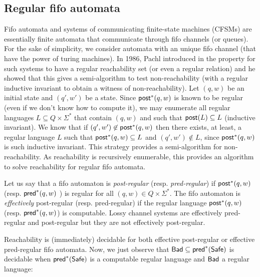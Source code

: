
%
%



\subsection{Regular fifo automata}

Fifo automata and systems of communicating finite-state machines (CFSMs) are essentially finite automata that communicate through fifo channels (or queues). For the sake of simplicity, we consider automata with an unique fifo channel (that have the power of turing machines). In 1986, Pachl introduced in \cite{} the property for such systems to have a regular reachability set (or even a regular relation) and he showed that this gives a semi-algorithm to test non-reachability (with a regular inductive invariant to obtain a witness of non-reachability). Let $(q,w)$ be an initial state and $(q',w')$ be a state. Since $\textsf{post}^*(q,w)$ is known to be regular (even if we don't know how to compute it), we may enumerate all regular languages $L \subseteq Q \times \Sigma^*$ that contain $(q,w)$ and such that $\textsf{post}(L) \subseteq L$ (inductive invariant). We know that if $(q',w') \not\in \textsf{post}^*(q,w)$ then there exists, at least, a regular language $L$ such that $\textsf{post}^*(q,w) \subseteq L$ and $(q',w') \not\in L$, since $\textsf{post}^*(q,w)$ is such inductive invariant. This strategy provides a semi-algorithm for non-reachability.
As reachability is recursively enumerable, this provides an algorithm to solve reachability for regular fifo automata.

Let us say that a fifo automaton is \emph{post-regular} (resp. \emph{pred-regular}) if $\textsf{post}^*(q,w)$ (resp. $\textsf{pred}^*(q,w)$ ) is regular for all $(q,w) \in Q \times \Sigma^*$. The  fifo automaton is \emph{effectively} post-regular (resp. pred-regular) if the regular language $\textsf{post}^*(q,w)$ (resp. $\textsf{pred}^*(q,w)$) is computable. Lossy channel systems are effectively pred-regular and post-regular but they are not effectively post-regular.

Reachability is (immediately) decidable for both effective post-regular or effective pred-regular fifo automata.
%
%
%
Now, we just observe that $\textsf{Bad} \subseteq \textsf{pred}^*(\textsf{Safe})$ is decidable when $\textsf{pred}^*(\textsf{Safe})$ is a computable regular language and $\textsf{Bad}$ a regular language: 

